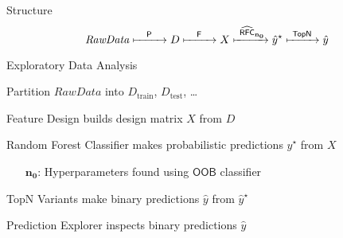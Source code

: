 \documentclass[handout]{beamer}
\begin{document}
\begin{frame}%
\begin{block}{Structure}
\setlength\abovedisplayskip{0pt}
\begin{equation*}
\mathit{RawData}
\xmapsto{\quad \mathsf{P} \quad }
D 
\xmapsto{\quad \mathsf{F}\quad }
X
\xmapsto{\ \operatorname{\widehat{\mathsf{RFC}}}_\mathbf{n_0} }
\hat{y}^\star
\xmapsto{\ \mathsf{TopN}\ }
\hat{y}
\end{equation*}
\end{block}
\vfill
\begin{description}[<+->]
\item[\(\mathit{RawData}\):] Exploratory Data Analysis
\item[\(\mathsf{P}\):] Partition \(\mathit{RawData}\) into $D_\text{train}$, $D_\text{test}$, \ldots
\item[\(\mathsf{F}\):] Feature Design builds design matrix $X$ from $D$
\item[\(\operatorname{\widehat{\mathsf{RFC}}}_\mathbf{n_0} \):] Random Forest Classifier makes probabilistic predictions \(\hat{y}^\star\) from $X$
\begin{itemize}
\item[\(\mathbf{n_0}\):] Hyperparameters found using \(\mathsf{OOB}\) classifier
\end{itemize}
\item[\(\mathsf{TopN}\):] TopN Variants make binary predictions \(\hat{y}\) from \(\hat{y}^\star\)
\item[\(\hat{y}\):] Prediction Explorer inspects binary predictions \(\hat{y}\)
\end{description}





\end{frame}
\end{document}

